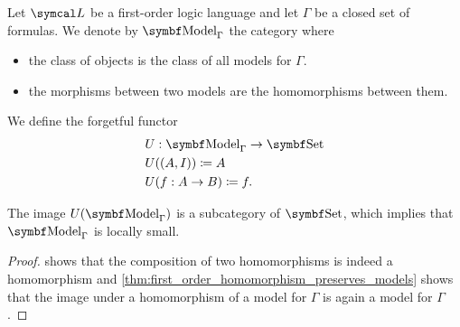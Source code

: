 \begin{definition}\label{def:first_order_model_category}
  Let \( \Cal{L} \) be a first-order logic language and let \( \Gamma \) be a closed set of formulas. We denote by \( \Cat{Model}_\Gamma \) the category where
  \begin{itemize}
    \item the class of objects is the class of all models for \( \Gamma \).
    \item the morphisms between two models are the homomorphisms between them.
  \end{itemize}

  We define the forgetful functor
  \begin{align*}
    &U: \Cat{Model}_\Gamma \to \Bold{Set} \\
    &U((A, I)) \coloneqq A \\
    &U(f: A \to B) \coloneqq f.
  \end{align*}

  The image \( U(\Cat{Model}_\Gamma) \) is a subcategory of \( \Bold{Set} \), which implies that \( \Bold{Model}_\Gamma \) is locally small.
\end{definition}
\begin{proof}
   shows that the composition of two homomorphisms is indeed a homomorphism and \cref{thm:first_order_homomorphism_preserves_models} shows that the image under a homomorphism of a model for \( \Gamma \) is again a model for \( \Gamma \).
\end{proof}
